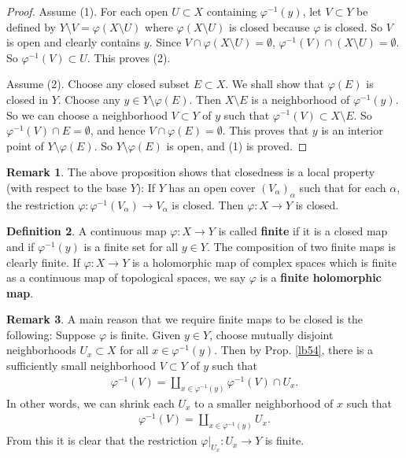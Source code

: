 \documentclass[12pt,b5paper,notitlepage]{report}
\theoremstyle{definition}
\newtheorem{df}{Definition}[section]
\newtheorem{rem}[df]{Remark}
\theoremstyle{plain}
\numberwithin{equation}{section}
\begin{document}
\begin{proof}
Assume (1). For each open $U\subset X$ containing $\varphi^{-1}(y)$, let $V\subset Y$ be defined by $Y\setminus V=\varphi(X\setminus U)$ where $\varphi(X\setminus U)$ is closed because $\varphi$ is closed. So $V$ is open and clearly contains $y$. Since $V\cap\varphi(X\setminus U)=\emptyset$, $\varphi^{-1}(V)\cap (X\setminus U)=\emptyset$. So $\varphi^{-1}(V)\subset U$. This proves (2).

Assume (2). Choose any closed subset $E\subset X$. We shall show that $\varphi(E)$ is closed in $Y$. Choose any $y\in Y\setminus\varphi(E)$. Then $X\setminus E$ is a neighborhood of $\varphi^{-1}(y)$. So we can choose a neighborhood $V\subset Y$ of $y$ such that $\varphi^{-1}(V)\subset X\setminus E$. So $\varphi^{-1}(V)\cap E=\emptyset$, and hence $V\cap \varphi(E)=\emptyset$. This proves that $y$ is an interior point of $Y\setminus\varphi(E)$. So $Y\setminus\varphi(E)$ is open, and (1) is proved.
\end{proof}



\begin{rem}\label{lb88}
The above proposition shows that closedness is a local property (with respect to the base $Y$): If $Y$ has an open cover $(V_\alpha)_\alpha$ such that for each $\alpha$, the restriction $\varphi:\varphi^{-1}(V_\alpha)\rightarrow V_\alpha$ is closed. Then $\varphi:X\rightarrow Y$ is closed.
\end{rem}

\begin{df}
A continuous map $\varphi:X\rightarrow Y$ is called \textbf{finite} if it is a closed map and if $\varphi^{-1}(y)$ is a finite set for all $y\in Y$.  The composition of two finite maps is clearly finite. If $\varphi:X\rightarrow Y$ is a holomorphic map of complex spaces which is finite as a continuous map of topological spaces, we say $\varphi$ is a \textbf{finite holomorphic map}.
\end{df}







\begin{rem}\label{lb55}
A main reason that we require finite maps to be closed is the following: Suppose $\varphi$ is finite. Given $y\in Y$, choose mutually disjoint neighborhoods $U_x\subset X$ for all $x\in\varphi^{-1}(y)$. Then by Prop. \ref{lb54}, there is a sufficiently small neighborhood $V\subset Y$ of $y$ such that
\begin{align}
\varphi^{-1}(V)=\coprod_{x\in\varphi^{-1}(y)} \varphi^{-1}(V)\cap U_x.\label{eq28}
\end{align}
In other words, we can shrink each $U_x$ to a smaller neighborhood of $x$ such that
\begin{align}
\varphi^{-1}(V)=\coprod_{x\in\varphi^{-1}(y)}U_x.\label{eq29}
\end{align}
From this it is clear that the restriction $\varphi|_{U_x}:U_x\rightarrow Y$ is finite.
\end{rem}
\end{document}
